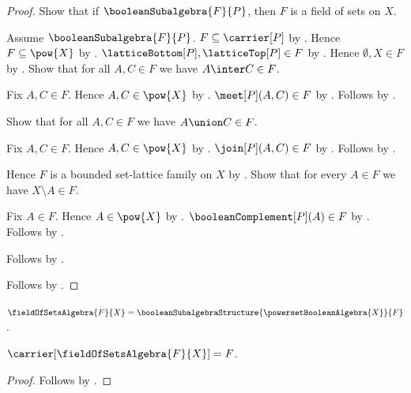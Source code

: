 \begin{proof}
    Show that if $\booleanSubalgebra{F}{P}$, then
        $F$ is a field of sets on $X$.
    \begin{subproof}
        Assume $\booleanSubalgebra{F}{P}$.
        $F\subseteq\carrier[P]$ by
            .
        Hence $F\subseteq\pow{X}$ by
            .
        $\latticeBottom[P],\latticeTop[P]\in F$ by
            .
        Hence $\emptyset,X\in F$ by
            .
        Show that for all $A,C\in F$ we have $A\inter C\in F$.
        \begin{subproof}
            Fix $A,C\in F$.
            Hence $A,C\in\pow{X}$ by .
            $\meet[P](A,C)\in F$ by .
            Follows by
                .
        \end{subproof}
        Show that for all $A,C\in F$ we have $A\union C\in F$.
        \begin{subproof}
            Fix $A,C\in F$.
            Hence $A,C\in\pow{X}$ by .
            $\join[P](A,C)\in F$ by .
            Follows by
                .
        \end{subproof}
        Hence $F$ is a bounded set-lattice family on $X$ by
            .
        Show that for every $A\in F$ we have $X\setminus A\in F$.
        \begin{subproof}
            Fix $A\in F$.
            Hence $A\in\pow{X}$ by .
            $\booleanComplement[P](A)\in F$ by
                .
            Follows by
                .
        \end{subproof}
        Follows by .
    \end{subproof}
    Follows by \auto.
\end{proof}

\begin{definition}\label{field_of_sets_algebra}
    $\fieldOfSetsAlgebra{F}{X}=
        \booleanSubalgebraStructure{\powersetBooleanAlgebra{X}}{F}$.
\end{definition}

\begin{proposition}\label{field_of_sets_algebra_carrier}
    $\carrier[\fieldOfSetsAlgebra{F}{X}]=F$.
\end{proposition}
\begin{proof}
    Follows by
        .
\end{proof}


